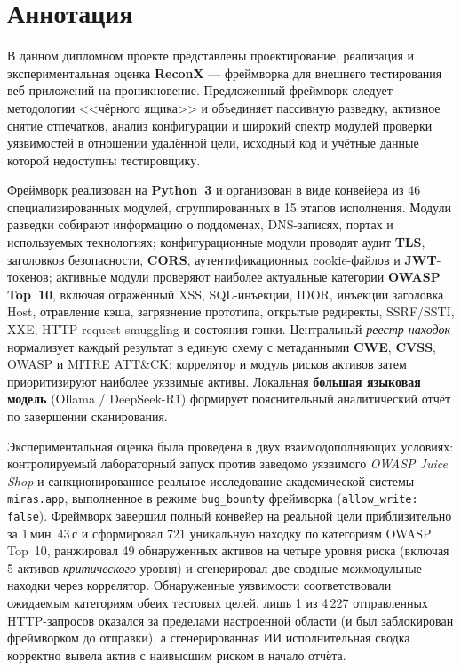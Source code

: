 \chapter*{Аннотация}
\begin{SingleSpace}
В данном дипломном проекте представлены проектирование, реализация и экспериментальная оценка \textbf{ReconX} --- фреймворка для внешнего тестирования веб-приложений на проникновение. Предложенный фреймворк следует методологии <<чёрного ящика>> и объединяет пассивную разведку, активное снятие отпечатков, анализ конфигурации и широкий спектр модулей проверки уязвимостей в отношении удалённой цели, исходный код и учётные данные которой недоступны тестировщику.

Фреймворк реализован на \textbf{Python~3} и организован в виде конвейера из 46 специализированных модулей, сгруппированных в 15 этапов исполнения. Модули разведки собирают информацию о поддоменах, DNS-записях, портах и используемых технологиях; конфигурационные модули проводят аудит \textbf{TLS}, заголовков безопасности, \textbf{CORS}, аутентификационных cookie-файлов и \textbf{JWT}-токенов; активные модули проверяют наиболее актуальные категории \textbf{OWASP Top~10}, включая отражённый XSS, SQL-инъекции, IDOR, инъекции заголовка Host, отравление кэша, загрязнение прототипа, открытые редиректы, SSRF/SSTI, XXE, HTTP request smuggling и состояния гонки. Центральный \textit{реестр находок} нормализует каждый результат в единую схему с метаданными \textbf{CWE}, \textbf{CVSS}, OWASP и MITRE ATT\&CK; коррелятор и модуль рисков активов затем приоритизируют наиболее уязвимые активы. Локальная \textbf{большая языковая модель} (Ollama / DeepSeek-R1) формирует пояснительный аналитический отчёт по завершении сканирования.

Экспериментальная оценка была проведена в двух взаимодополняющих условиях: контролируемый лабораторный запуск против заведомо уязвимого \textit{OWASP Juice Shop} и санкционированное реальное исследование академической системы \texttt{miras.app}, выполненное в режиме \texttt{bug\_bounty} фреймворка (\texttt{allow\_write: false}). Фреймворк завершил полный конвейер на реальной цели приблизительно за 1\,мин~43\,с и сформировал 721 уникальную находку по категориям OWASP Top~10, ранжировал 49 обнаруженных активов на четыре уровня риска (включая 5 активов \textit{критического} уровня) и сгенерировал две сводные межмодульные находки через коррелятор. Обнаруженные уязвимости соответствовали ожидаемым категориям обеих тестовых целей, лишь 1 из 4\,227 отправленных HTTP-запросов оказался за пределами настроенной области (и был заблокирован фреймворком до отправки), а сгенерированная ИИ исполнительная сводка корректно вывела актив с наивысшим риском в начало отчёта.


\end{SingleSpace}
